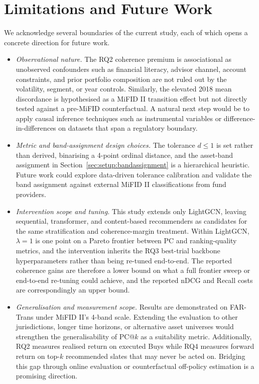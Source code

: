 \section{Limitations and Future Work}
\label{sec:limitations}

We acknowledge several boundaries of the current study, each of which opens a concrete direction for future work.

\begin{itemize}
    \item \textit{Observational nature.} The RQ2 coherence premium is associational as unobserved confounders such as financial literacy, advisor channel, account constraints, and prior portfolio composition are not ruled out by the volatility, segment, or year controls. Similarly, the elevated 2018 mean discordance is hypothesised as a MiFID II transition effect but not directly tested against a pre-MiFID counterfactual. A natural next step would be to apply causal inference techniques such as instrumental variables or difference-in-differences on datasets that span a regulatory boundary.
    \item \textit{Metric and band-assignment design choices.} The tolerance $d \leq 1$ is set rather than derived, binarising a 4-point ordinal distance, and the asset-band assignment in Section~\ref{sec:setup:bandassignment} is a hierarchical heuristic. Future work could explore data-driven tolerance calibration and validate the band assignment against external MiFID II classifications from fund providers.
    \item \textit{Intervention scope and tuning.} This study extends only LightGCN, leaving sequential, transformer, and content-based recommenders as candidates for the same stratification and coherence-margin treatment. Within LightGCN, $\lambda = 1$ is one point on a Pareto frontier between PC and ranking-quality metrics, and the intervention inherits the RQ3 best-trial backbone hyperparameters rather than being re-tuned end-to-end. The reported coherence gains are therefore a lower bound on what a full frontier sweep or end-to-end re-tuning could achieve, and the reported nDCG and Recall costs are correspondingly an upper bound.
    \item \textit{Generalisation and measurement scope.} Results are demonstrated on FAR-Trans under MiFID II's 4-band scale. Extending the evaluation to other jurisdictions, longer time horizons, or alternative asset universes would strengthen the generalisability of PC@$k$ as a suitability metric. Additionally, RQ2 measures realised return on executed Buys while RQ4 measures forward return on top-$k$ recommended slates that may never be acted on. Bridging this gap through online evaluation or counterfactual off-policy estimation is a promising direction.
\end{itemize}
